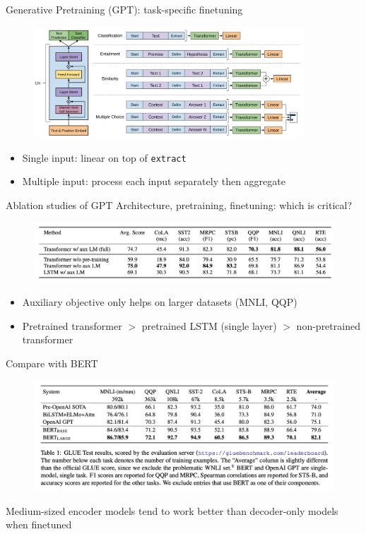 \documentclass[usenames,dvipsnames,notes,11pt,aspectratio=169,hyperref={colorlinks=true, linkcolor=blue}]{beamer}
\begin{document}
\begin{frame}
    {Generative Pretraining (GPT): task-specific finetuning}
    \begin{figure}
        \includegraphics[width=0.9\textwidth]{figures/gpt1}
    \end{figure}
    \begin{itemize}
        \item Single input: linear on top of \texttt{extract}
        \item Multiple input: process each input separately then aggregate
    \end{itemize}
\end{frame}

\begin{frame}
    {Ablation studies of GPT}
    Architecture, pretraining, finetuning: which is critical?
    \begin{figure}
        \includegraphics[width=\textwidth]{figures/gpt-ablation}
    \end{figure}
    \begin{itemize}
        \item Auxiliary objective only helps on larger datasets (MNLI, QQP)
        \item Pretrained transformer $>$ pretrained LSTM (single layer) $>$ non-pretrained transformer
    \end{itemize}
\end{frame}

\begin{frame}
    {Compare with BERT}
    \begin{figure}
        \includegraphics[width=\textwidth]{figures/bert-results}
    \end{figure}
    Medium-sized encoder models tend to work better than decoder-only models when finetuned
\end{frame}
\end{document}
